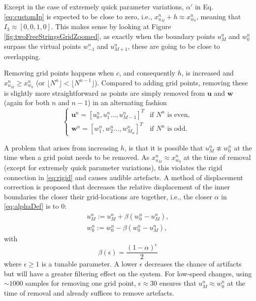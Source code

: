 Except in the case of extremely quick parameter variations, $\alpha'$ in Eq. \eqref{eq:customIp} is expected to be close to zero, i.e., $x_{u_M}^n + h \approx x_{w_0}^n$, meaning that $I_3 \approx [0, 0, 1, 0]$. This makes sense by looking at Figure \ref{fig:twoFreeStringsGridZoomed}, as exactly when the boundary points $u_M^n$ and $w_0^n$ surpass the virtual points $w_{-1}^n$ and $u_{M+1}^n$, these are going to be close to overlapping.

Removing grid points happens when $c$, and consequently $h$, is increased and $x_{u_M}^n \geq x_{w_0}^n$ (or $\lfloor N^n\rfloor < \lfloor N^{n-1}\rfloor$). Compared to adding grid points, removing these is slightly more straightforward as points are simply removed from $\mathbf{u}$ and $\mathbf{w}$ (again for both $n$ and $n-1$) in an alternating fashion
\begin{equation}\label{eq:removingPoint}
\begin{cases}
    \mathbf{u}^n = [u_0^n, u_1^n ..., u_{M-1}^n]^T & \text{if $N^n$ is even}, \\
     \mathbf{w}^n = [w_1^n, w_2^n ..., w_{M_w}^n]^T & \text{if $N^n$ is odd}.
    \end{cases}
\end{equation}

A problem that arises from increasing $h$, is that it is possible that $u_M^n \not\approx w_0^n$ at the time when a grid point needs to be removed. As $x_{u_M}^n \approx x_{w_0}^n$ at the time of removal (except for extremely quick parameter variations), this violates the rigid connection in \eqref{eq:rigid} and causes audible artefacts. A method of displacement correction is proposed that decreases the relative displacement of the inner boundaries the closer their grid-locations are together, i.e., the closer $\alpha$ in \eqref{eq:alphaDef} is to 0:
\begin{equation}\label{eq:dispCorr}
    \begin{aligned}
    u_M^n := u_M^n +\beta (w_0^n - u_M^n),\\
    w_0^n := w_0^n - \beta  (w_0^n - u_M^n),
    \end{aligned}
\end{equation}
with
\begin{equation}\label{eq:betaDef}
    \beta(\epsilon) = \frac{(1-\alpha)^\epsilon}{2}
\end{equation}
where $\epsilon \geq 1$ is a tunable parameter. A lower $\epsilon$ decreases the chance of artifacts but will have a greater filtering effect on the system. For low-speed changes, using $\sim 1000$ samples for removing one grid point, $\epsilon \approx 30$ ensures that $u_M^n \approx w_0^n$ at the time of removal and already suffices to remove artefacts.

